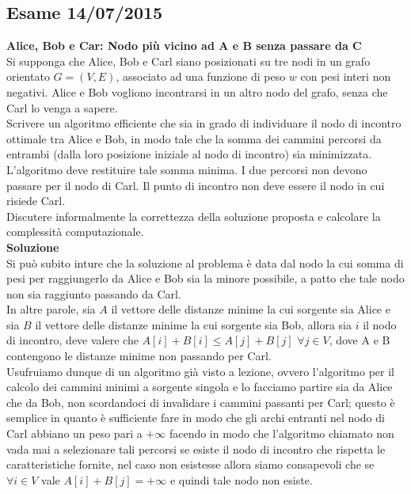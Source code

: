 \documentclass[../cheatSheetAlgoritmi.tex]{subfiles}
\begin{document}
\subsection{Esame 14/07/2015}
\textbf{Alice, Bob e Car: Nodo più vicino ad A e B senza passare da C} \\
Si supponga che Alice, Bob e Carl siano posizionati su tre nodi in un grafo orientato $G= (V, E)$, associato ad una funzione di peso $w$ con pesi interi non negativi. Alice e Bob vogliono incontrarsi in un altro nodo del grafo, senza che Carl lo venga a sapere. \\
Scrivere un algoritmo efficiente che sia in grado di individuare il nodo di incontro ottimale tra Alice e Bob, in modo tale che la somma dei cammini percorsi da entrambi (dalla loro posizione iniziale al nodo di incontro) sia minimizzata. \\
L'algoritmo deve restituire tale somma minima. I due percorsi non devono passare per il nodo di Carl. Il punto di incontro non deve essere il nodo in cui risiede Carl. \\
Discutere informalmente la correttezza della soluzione proposta e calcolare la complessità computazionale. \\
\textbf{Soluzione} \\
Si può subito inture che la soluzione al problema è data dal nodo la cui somma di pesi per raggiungerlo da Alice e Bob sia la minore possibile, a patto che tale nodo non sia raggiunto passando da Carl. \\
In altre parole, sia $A$ il vettore delle distanze minime la cui sorgente sia Alice e sia $B$ il vettore delle distanze minime la cui sorgente sia Bob, allora sia $i$ il nodo di incontro, deve valere che $A[i] + B[i] \leq A[j] + B[j]$ $ \forall j \in V$, dove A e B contengono le distanze minime non passando per Carl. \\
Usufruiamo dunque di un algoritmo già visto a lezione, ovvero l'algoritmo per il calcolo dei cammini minimi a sorgente singola e lo facciamo partire sia da Alice che da Bob, non scordandoci di invalidare i cammini passanti per Carl; questo è semplice in quanto è sufficiente fare in modo che gli archi entranti nel nodo di Carl abbiano un peso pari a $+\infty$ facendo in modo che l'algoritmo chiamato non vada mai a selezionare tali percorsi se esiste il nodo di incontro che rispetta le caratteristiche fornite, nel caso non esistesse allora siamo consapevoli che se $\forall i \in V$ vale $A[i] + B[j] = +\infty$ e quindi tale nodo non esiste. \\
\end{document}
